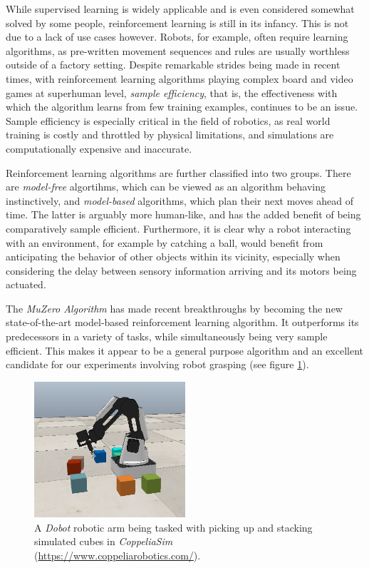 While supervised learning is widely applicable and is even considered somewhat solved by some people, reinforcement learning is still in its infancy. This is not due to a lack of use cases however. Robots, for example, often require learning algorithms, as pre-written movement sequences and rules are usually worthless outside of a factory setting. Despite remarkable strides being made in recent times, with reinforcement learning algorithms playing complex board and video games at superhuman level, \textit{sample efficiency}, that is, the effectiveness with which the algorithm learns from few training examples, continues to be an issue. Sample efficiency is especially critical in the field of robotics, as real world training is costly and throttled by physical limitations, and simulations are computationally expensive and inaccurate.

Reinforcement learning algorithms are further classified into two groups. There are \textit{model-free} algortihms, which can be viewed as an algorithm behaving instinctively, and \textit{model-based} algorithms, which plan their next moves ahead of time. The latter is arguably more human-like, and has the added benefit of being comparatively sample efficient. Furthermore, it is clear why a robot interacting with an environment, for example by catching a ball, would benefit from anticipating the behavior of other objects within its vicinity, especially when considering the delay between sensory information arriving and its motors being actuated.

The \textit{MuZero Algorithm} \cite{muzero} has made recent breakthroughs by becoming the new state-of-the-art model-based reinforcement learning algorithm. It outperforms its predecessors in a variety of tasks, while simultaneously being very sample efficient. This makes it appear to be a general purpose algorithm and an excellent candidate for our experiments involving robot grasping (see figure \ref{fig:cube_stacking}).
\begin{figure}[ht]
    \centering
    \includegraphics[width=0.5\textwidth]{assets/cube_stacking.png}
    \caption{A \textit{Dobot} robotic arm being tasked with picking up and stacking simulated cubes in \textit{CoppeliaSim} (\url{https://www.coppeliarobotics.com/}).}
    \label{fig:cube_stacking}
\end{figure}

